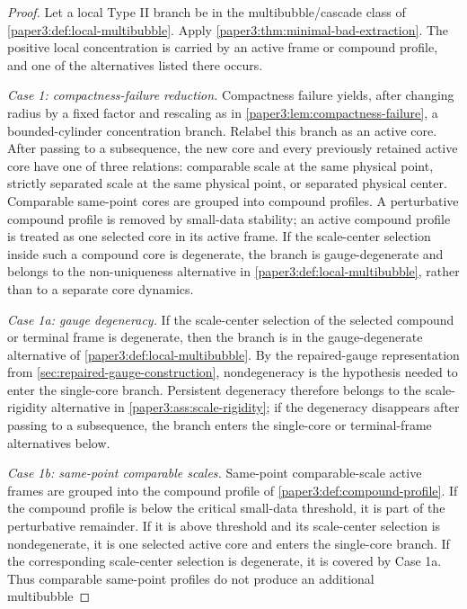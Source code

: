 \documentclass[11pt]{amsart}
\theoremstyle{plain}
\theoremstyle{definition}
\theoremstyle{remark}
\begin{document}
\begin{proof}
Let a local Type II branch be in the multibubble/cascade class of
\cref{paper3:def:local-multibubble}.  Apply \cref{paper3:thm:minimal-bad-extraction}.  The
positive local concentration is carried by an active frame or compound profile,
and one of the alternatives listed there occurs.
\par
\textit{Case 1: compactness-failure reduction.}
Compactness failure yields, after changing radius by a fixed factor and
rescaling as in \cref{paper3:lem:compactness-failure}, a bounded-cylinder concentration
branch.  Relabel this branch as an active core.  After passing to a subsequence,
the new core and every previously retained active core have one of three
relations: comparable scale at the same physical point, strictly separated scale
at the same physical point, or separated physical center.  Comparable same-point
cores are grouped into compound profiles.  A perturbative compound profile is
removed by small-data stability; an active compound profile is treated as one
selected core in its active frame.  If the scale-center selection inside such a
compound core is degenerate, the branch is gauge-degenerate and belongs to the
non-uniqueness alternative in \cref{paper3:def:local-multibubble}, rather than to
a separate core dynamics.
\par
\textit{Case 1a: gauge degeneracy.}
If the scale-center selection of the selected compound or terminal frame is
degenerate, then the branch is in the gauge-degenerate alternative of
\cref{paper3:def:local-multibubble}.  By the repaired-gauge representation
from \cref{sec:repaired-gauge-construction}, nondegeneracy is the hypothesis needed to enter the
single-core branch.  Persistent degeneracy therefore belongs to the
scale-rigidity alternative in \cref{paper3:ass:scale-rigidity}; if the degeneracy
disappears after passing to a subsequence, the branch enters the single-core or
terminal-frame alternatives below.
\par
\textit{Case 1b: same-point comparable scales.}
Same-point comparable-scale active frames are grouped into the compound profile
of \cref{paper3:def:compound-profile}.  If the compound profile is below the critical
small-data threshold, it is part of the perturbative remainder.  If it is above
threshold and its scale-center selection is nondegenerate, it is one selected
active core and enters the single-core branch.  If the corresponding
scale-center selection is degenerate, it is covered by Case 1a.  Thus
comparable same-point profiles do not produce an additional multibubble

\end{proof}
\end{document}
